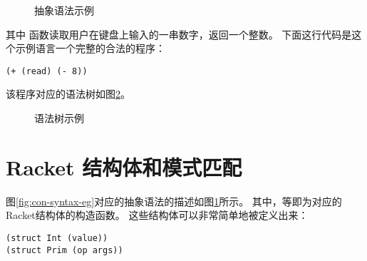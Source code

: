 \begin{figure}[t]
  \caption{抽象语法示例}
  \label{fig:abs-syntax-eg}
\end{figure}

其中  函数读取用户在键盘上输入的一串数字，返回一个整数。
下面这行代码是这个示例语言一个完整的合法的程序：

\begin{lstlisting}
(+ (read) (- 8))
\end{lstlisting}

该程序对应的语法树如图\ref{fig:ast-eg}。

\begin{figure}[t]
  \begin{center}
  \end{center}
  \caption{语法树示例}
  \label{fig:ast-eg}
\end{figure}

\section{Racket 结构体和模式匹配}

图\ref{fig:con-syntax-eg}对应的抽象语法的描述如图\ref{fig:abs-syntax-eg}所示。
其中，等即为对应的Racket结构体的构造函数。
这些结构体可以非常简单地被定义出来：
\begin{lstlisting}
(struct Int (value))
(struct Prim (op args))
\end{lstlisting}

